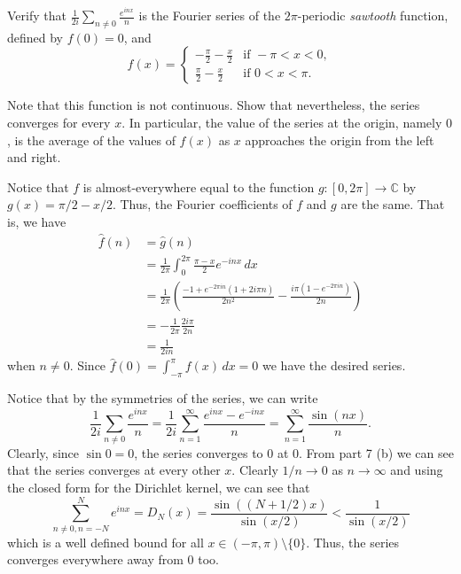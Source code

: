 \documentclass[12 pt, letterpaper]{hmcpset}
\begin{document}
\pagebreak

\begin{problem}[S \& S \S 2.6 \#8.]
	Verify that $\frac{1}{2i} \sum_{n \neq 0} \frac{e^{i n x}}{n}$ is the Fourier series of the $2 \pi$-periodic \emph{sawtooth} function, defined by $f(0) = 0$, and
	\[
		f(x) = \begin{cases}
			- \frac{\pi}{2} - \frac{x}{2} & \text{if } -\pi < x < 0, \\
			\frac{\pi}{2} - \frac{x}{2} & \text{if } 0 < x < \pi.
		\end{cases}
	\]

	Note that this function is not continuous. Show that nevertheless, the series converges for every $x$. In particular, the value of the series at the origin, namely $0$, is the average of the values of $f(x)$ as $x$ approaches the origin from the left and right.
\end{problem}

\begin{solution}
	Notice that $f$ is almost-everywhere equal to the function $g : [0, 2 \pi] \to \mathbb{C}$ by $g(x) = \pi / 2 - x / 2$. Thus, the Fourier coefficients of $f$ and $g$ are the same. That is, we have
	\begin{align*}
		\hat{f}(n) & = \hat{g}(n) \\
			   & = \frac{1}{2 \pi} \int_{0}^{2 \pi} \frac{\pi - x}{2} e^{-i n x} \, dx \\
			   & = \frac{1}{2 \pi} \left ( \frac{-1 + e^{-2 \pi i n}(1 + 2 i \pi n)}{2 n^{2}} - \frac{i \pi(1 - e^{-2 \pi i n})}{2 n} \right ) \\
			   & = -\frac{1}{2 \pi} \frac{2 i \pi}{2 n} \\
			   & = \frac{1}{2 i n}
	\end{align*}
	when $n \neq 0$. Since $\hat{f}(0) = \int_{-\pi}^{\pi} f(x) \, dx = 0$ we have the desired series.

	Notice that by the symmetries of the series, we can write
	\[
		\frac{1}{2 i} \sum_{n \neq 0} \frac{e^{i n x}}{n} = \frac{1}{2 i} \sum_{n = 1}^{\infty} \frac{e^{i n x} - e^{-i n x}}{n} = \sum_{n = 1}^{\infty} \frac{\sin{(n x)}}{n}.
	\]
	Clearly, since $\sin{0} = 0$, the series converges to $0$ at $0$. From part 7 (b) we can see that the series converges at every other $x$. Clearly $1 / n \to 0$ as $n \to \infty$ and using the closed form for the Dirichlet kernel, we can see that 
	 \[
		\sum_{n \neq 0, n = -N}^{N} {e^{i n x}} = D_{N}(x) = \frac{\sin{((N + 1/2) x)}}{\sin{(x / 2)}} < \frac{1}{\sin{(x / 2)}}
	\]
	which is a well defined bound for all $x \in (-\pi, \pi) \setminus \{ 0 \}$. Thus, the series converges everywhere away from $0$ too.
\end{solution}
\end{document}
